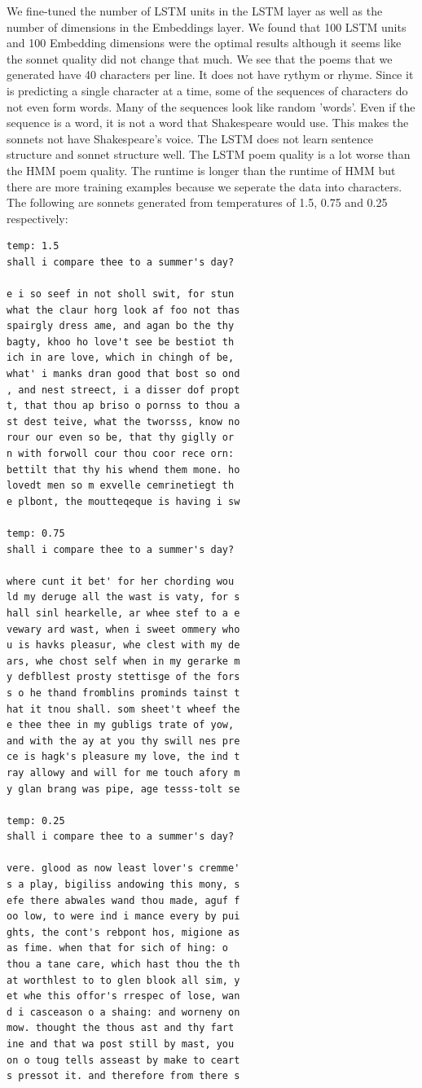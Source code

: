 We fine-tuned the number of LSTM units in the LSTM layer as well as the number of dimensions in the Embeddings layer. We found that 100 LSTM units and 100 Embedding dimensions were the optimal results although it seems like the sonnet quality did not change that much. We see that the poems that we generated have 40 characters per line. It does not have rythym or rhyme. Since it is predicting a single character at a time, some of the sequences of characters do not even form words. Many of the sequences look like random 'words'. Even if the sequence is a word, it is not a word that Shakespeare would use. This makes the sonnets not have Shakespeare's voice. The LSTM does not learn sentence structure and sonnet structure well. The LSTM poem quality is a lot worse than the HMM poem quality. The runtime is longer than the runtime of HMM but there are more training examples because we seperate the data into characters. 
The following are sonnets generated from temperatures of 1.5, 0.75 and 0.25 respectively:
\begin{verbatim}
temp: 1.5 
shall i compare thee to a summer's day?

e i so seef in not sholl swit, for stun 
what the claur horg look af foo not thas
spairgly dress ame, and agan bo the thy
bagty, khoo ho love't see be bestiot th
ich in are love, which in chingh of be, 
what' i manks dran good that bost so ond
, and nest streect, i a disser dof propt
t, that thou ap briso o pornss to thou a
st dest teive, what the tworsss, know no
rour our even so be, that thy giglly or
n with forwoll cour thou coor rece orn: 
bettilt that thy his whend them mone. ho
lovedt men so m exvelle cemrinetiegt th
e plbont, the moutteqeque is having i sw

temp: 0.75
shall i compare thee to a summer's day?

where cunt it bet' for her chording wou
ld my deruge all the wast is vaty, for s
hall sinl hearkelle, ar whee stef to a e
vewary ard wast, when i sweet ommery who
u is havks pleasur, whe clest with my de
ars, whe chost self when in my gerarke m
y defbllest prosty stettisge of the fors
s o he thand fromblins prominds tainst t
hat it tnou shall. som sheet't wheef the
e thee thee in my gubligs trate of yow, 
and with the ay at you thy swill nes pre
ce is hagk's pleasure my love, the ind t
ray allowy and will for me touch afory m
y glan brang was pipe, age tesss-tolt se

temp: 0.25
shall i compare thee to a summer's day?

vere. glood as now least lover's cremme'
s a play, bigiliss andowing this mony, s
efe there abwales wand thou made, aguf f
oo low, to were ind i mance every by pui
ghts, the cont's rebpont hos, migione as
as fime. when that for sich of hing: o 
thou a tane care, which hast thou the th
at worthlest to to glen blook all sim, y
et whe this offor's rrespec of lose, wan
d i casceason o a shaing: and worneny on
mow. thought the thous ast and thy fart
ine and that wa post still by mast, you 
on o toug tells asseast by make to ceart
s pressot it. and therefore from there s
\end{verbatim}

